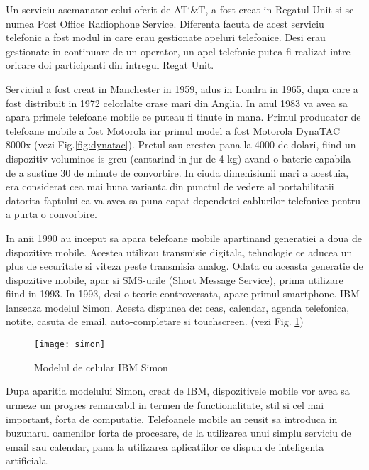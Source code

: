	Un serviciu asemanator celui oferit de AT\char`&T, a fost creat in Regatul Unit si se numea Post Office Radiophone Service. Diferenta facuta de acest serviciu telefonic a fost modul in care erau gestionate apeluri telefonice. Desi erau gestionate in continuare de un operator, un apel telefonic putea fi realizat intre oricare doi participanti din intregul Regat Unit. 
	
	Serviciul a fost creat in Manchester in 1959, adus in Londra in 1965, dupa care a fost distribuit in 1972 celorlalte orase mari din Anglia.
	In anul 1983 va avea sa apara primele telefoane mobile ce puteau fi tinute in mana. Primul producator de telefoane mobile a fost Motorola iar primul model a fost Motorola DynaTAC 8000x (vezi Fig.\ref{fig:dynatac}). Pretul sau crestea pana la 4000 de dolari, fiind un dispozitiv voluminos is greu (cantarind in jur de 4 kg)  avand o baterie capabila de a sustine 30 de minute de convorbire. In ciuda dimenisiunii mari a acestuia, era considerat cea mai buna varianta din punctul de vedere al portabilitatii datorita faptului ca va avea sa puna capat dependetei cablurilor telefonice pentru a purta o convorbire.

	
	In anii 1990 au inceput sa apara telefoane mobile apartinand generatiei a doua de dispozitive mobile. Acestea utilizau transmisie digitala, tehnologie ce aducea un plus de securitate si viteza peste transmisia analog. Odata cu aceasta generatie de dispozitive mobile, apar si SMS-urile (Short Message Service), prima utilizare fiind in 1993.
	In 1993, desi o teorie controversata, apare primul smartphone. IBM lanseaza modelul Simon. Acesta dispunea de: ceas, calendar, agenda telefonica, notite, casuta de email, auto-completare si touchscreen. (vezi Fig. \ref{fig:simon})
	
	
	
		\begin{figure}[H]
		\texttt{[image: simon]}  
		\caption{\label{fig:simon} Modelul de celular IBM Simon
			\protect
			\cite{ibm_simon}}
	\end{figure}
	
	
	Dupa aparitia modelului Simon, creat de IBM, dispozitivele mobile vor avea sa urmeze un progres remarcabil in termen de functionalitate, stil si cel mai important, forta de computatie. 
	Telefoanele mobile au reusit sa introduca in buzunarul oamenilor forta de procesare, de la utilizarea unui simplu serviciu de email sau calendar, pana la utilizarea aplicatiilor ce dispun de inteligenta artificiala. \cite{history_cellphones}
	\newline
	
